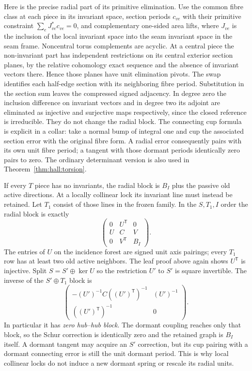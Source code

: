 Here is the precise radial part of its primitive elimination.
Use the common fibre class at each piece in its invariant space,
section periods \(c_{ve}\) with their primitive constraint
\(\sum_e J_{ve}^{*}c_{ve}=0\), and complementary one-sided area
lifts, where \(J_{ve}\) is the inclusion of the local invariant
space into the seam invariant space in the seam frame. Noncentral
torus complements are acyclic. At a central piece the
non-invariant part has independent restrictions on its central
exterior section planes, by the relative cohomology exact
sequence and the absence of invariant vectors there. Hence those
planes have unit elimination pivots. The swap identifies each
half-edge section with its neighboring fibre period. Substitution
in the section sum leaves the compressed signed adjacency.
In degree zero the inclusion difference on invariant vectors
and in degree two its adjoint are eliminated as injective and
surjective maps respectively, since the closed reference is
irreducible. They do not change the radial block. The connecting
cup formula is explicit in a collar: take a normal bump of
integral one and cup the associated section error with the
original fibre form. A radial error consequently pairs with its
own unit fibre period; a tangent with those dormant periods
identically zero pairs to zero. The ordinary determinant version
is also used in Theorem~\ref{thm:hall:torsion}.

If every \(T\) piece has no invariants, the radial block is
\(B_I\) plus the passive old active directions. At a locally
collinear lock its invariant line must instead be retained. Let
\(T_1\) consist of those lines in the frozen family. In the
\(S,T_1,I\) order the radial block is exactly
\begin{equation}
 \begin{pmatrix}0&U^{\mathsf T}&0\\
                 U&C&V\\
                 0&V^{\mathsf T}&B_I
 \end{pmatrix}.
 \label{classic:eq:activeblock}
\end{equation}
The entries of \(U\) on the incidence forest are signed unit
axis pairings; every \(T_1\) row has at least two old active
neighbors. The leaf proof above again shows \(U^{\mathsf T}\)
is injective. Split \(S=S'\oplus\ker U\) so the restriction
\(U'\) to \(S'\) is square invertible. The inverse of the
\(S'\oplus T_1\) block is
\[
 \begin{pmatrix}
 -(U')^{-1}C((U')^{\mathsf T})^{-1}&(U')^{-1}\\
 ((U')^{\mathsf T})^{-1}&0
 \end{pmatrix}.
\]
In particular it has \emph{zero hub--hub block}. The dormant
coupling reaches only that block, so the Schur correction is
identically zero and the retained graph is \(B_I\) itself.
A dormant tangent may acquire an \(S'\) correction, but its
cup pairing with a dormant connecting error is still the unit
dormant period. This is why local collinear locks do not induce
a new dormant spring or rescale its radial units.

